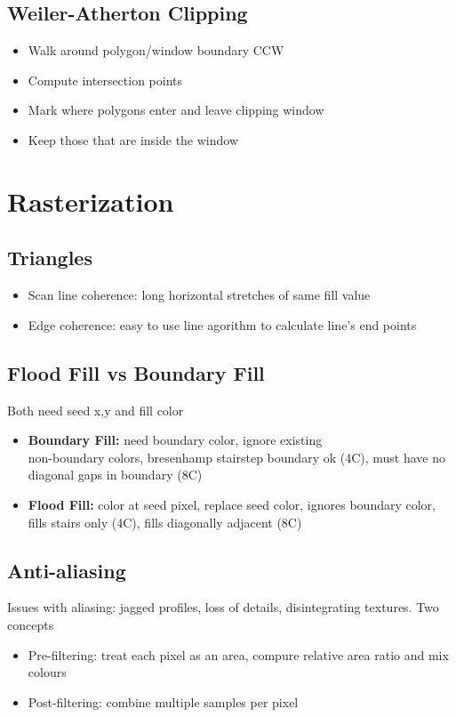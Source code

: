 \documentclass[a4paper]{article}
\begin{document}
\subsection{Weiler-Atherton Clipping}
\begin{itemize}
	\item Walk around polygon/window boundary CCW
	\item Compute intersection points
	\item Mark where polygons enter and leave clipping window
	\item Keep those that are inside the window
\end{itemize}


\section{Rasterization}
\subsection{Triangles}
\begin{itemize}[leftmargin=0pt]
	\item Scan line coherence: long horizontal stretches of same fill value
	\item Edge coherence: easy to use line agorithm to calculate line's end points
\end{itemize}

\subsection{Flood Fill vs Boundary Fill}
Both need seed x,y and fill color
\begin{itemize}[leftmargin=0pt]
	\item \textbf{Boundary Fill:}  need boundary color, ignore existing 
	\\non-boundary colors, bresenhamp stairstep boundary ok (4C), must have no diagonal gaps in boundary (8C)
	\item \textbf{Flood Fill:}  color at seed pixel, replace seed color, ignores boundary color, fills stairs only (4C), fills diagonally adjacent (8C)
\end{itemize}



\subsection{Anti-aliasing}
Issues with aliasing: jagged profiles, loss of details, disintegrating textures.
Two concepts
\begin{itemize}
	\item Pre-filtering: treat each pixel as an area, compure relative area ratio and mix colours
	\item Post-filtering: combine multiple samples per pixel
\end{itemize}
\end{document}
